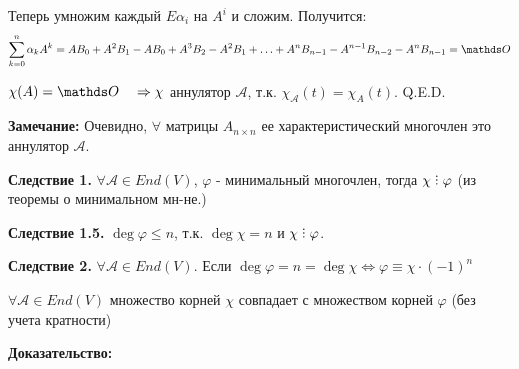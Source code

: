 Теперь умножим каждый $E\alpha_i$ на $A^i$ и сложим. Получится:
$$\sum\limits_{k=0}^{n} \alpha_kA^k = AB_0 +A^2B_1 - AB_0 + A^3B_2 - A^2B_1+ \ldots + A^nB_{n-1} - A^{n-1}B_{n-2} -A^nB_{n-1} = \zero$$

$\chi (A) = \zero \quad \Rightarrow \chi  $ аннулятор $\mathcal{A}$, т.к. $\chi_{\mathcal{A}}(t)=\chi_{A}(t)$.
 \hfill Q.E.D.

\textbf{Замечание:} Очевидно, $\forall$ матрицы $A_{n \times n}$ ее характеристический многочлен это аннулятор $\mathcal{A}$.

\textbf{Следствие 1.} $\forall \mathcal{A} \in End(V)$, $\varphi$ - минимальный многочлен, тогда $\chi \divby \varphi $ (из теоремы о минимальном мн-не.)

\textbf{Следствие 1.5.} $\deg \varphi \leq n$, т.к. $\deg \chi = n$ и $\chi \divby \varphi$.

\textbf{Следствие 2.} $\forall \mathcal{A} \in End(V)$. Если $\deg  \varphi = n = \deg \chi \Leftrightarrow \varphi \equiv \chi \cdot (-1)^n$


$\forall \mathcal{A} \in End(V)$ множество корней $\chi$ совпадает с множеством корней $\varphi$ (без учета кратности)

\textbf{Доказательство:}

